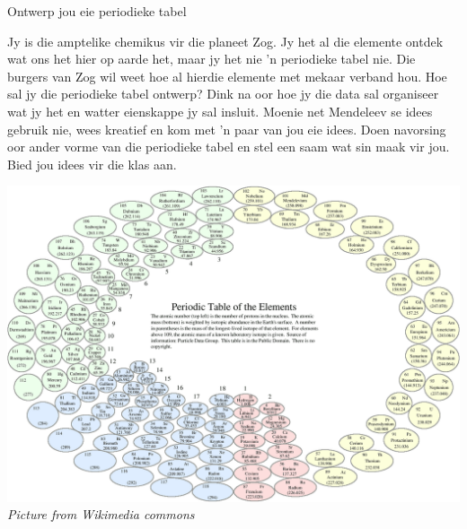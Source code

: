 \begin{activity}{Ontwerp jou eie periodieke tabel}
            \nopagebreak
            \label{m38760*eip-603}
\begin{minipage}{.5\textwidth}
Jy is die amptelike chemikus vir die planeet Zog. Jy het al die elemente ontdek wat ons het hier op aarde het, maar jy het nie 'n periodieke tabel nie. Die burgers van Zog wil weet hoe al hierdie elemente met mekaar verband hou. Hoe sal jy die periodieke tabel ontwerp? Dink na oor hoe jy die data sal organiseer wat jy het en watter eienskappe jy sal insluit. Moenie net Mendeleev se idees gebruik nie, wees kreatief en kom met 'n paar van jou eie idees. Doen navorsing oor ander vorme van die periodieke tabel en stel een saam wat sin maak vir jou. Bied jou idees vir die klas aan.
\end{minipage}
\begin{minipage}{.5\textwidth}
\begin{center}
\includegraphics[width=.8\textwidth]{photos/Circular_periodic_table.png}\\
\textsl{Picture from Wikimedia commons}
\end{center}
\end{minipage}

\end{activity}
